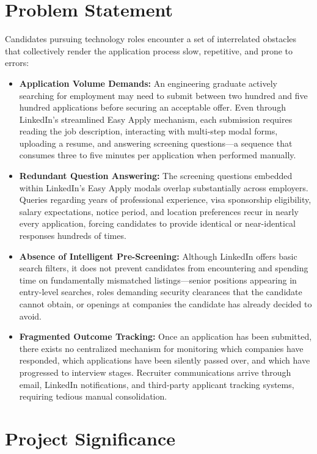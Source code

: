 \documentclass[12pt, a4paper, oneside]{report}
\begin{document}
\section{Problem Statement}
\label{sec:problem-statement}

Candidates pursuing technology roles encounter a set of interrelated obstacles that collectively render the application process slow, repetitive, and prone to errors:

\begin{itemize}
    \item \textbf{Application Volume Demands:} An engineering graduate actively searching for employment may need to submit between two hundred and five hundred applications before securing an acceptable offer. Even through LinkedIn's streamlined Easy Apply mechanism, each submission requires reading the job description, interacting with multi-step modal forms, uploading a resume, and answering screening questions---a sequence that consumes three to five minutes per application when performed manually.
    \item \textbf{Redundant Question Answering:} The screening questions embedded within LinkedIn's Easy Apply modals overlap substantially across employers. Queries regarding years of professional experience, visa sponsorship eligibility, salary expectations, notice period, and location preferences recur in nearly every application, forcing candidates to provide identical or near-identical responses hundreds of times.
    \item \textbf{Absence of Intelligent Pre-Screening:} Although LinkedIn offers basic search filters, it does not prevent candidates from encountering and spending time on fundamentally mismatched listings---senior positions appearing in entry-level searches, roles demanding security clearances that the candidate cannot obtain, or openings at companies the candidate has already decided to avoid.
    \item \textbf{Fragmented Outcome Tracking:} Once an application has been submitted, there exists no centralized mechanism for monitoring which companies have responded, which applications have been silently passed over, and which have progressed to interview stages. Recruiter communications arrive through email, LinkedIn notifications, and third-party applicant tracking systems, requiring tedious manual consolidation.
\end{itemize}

\section{Project Significance}
\label{sec:project-significance}
\end{document}
